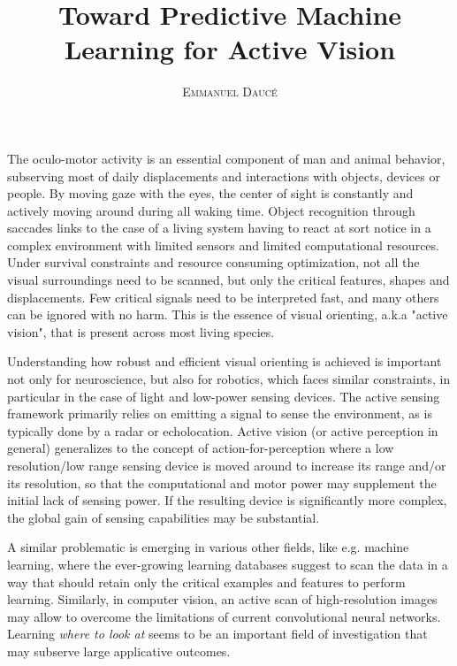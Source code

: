 \documentclass[12pt,twoside,openright]{article}
\title{\textbf{Toward Predictive Machine Learning for Active Vision} }
\author{\textsc{Emmanuel Daucé}}%
\date{}
\begin{document}
	
\maketitle
	
	The oculo-motor activity is an essential component of man and animal behavior, subserving most of daily displacements and interactions with objects, devices or people. By moving gaze with the eyes, the center of sight is constantly and actively moving around during all waking time.  %
	Object recognition through saccades links to the case of a living system having to react at sort notice in a complex environment with limited sensors and limited computational resources. Under survival constraints and resource consuming optimization, not all the visual surroundings need to be scanned, but only the critical features, shapes and displacements. Few critical signals need to be interpreted fast, and many others can be ignored with no harm. This is the essence of visual orienting, a.k.a "active vision", that is present across most living species.  
	
	Understanding how robust and efficient visual orienting is achieved is important not only for neuroscience, but also for robotics, which faces similar constraints, in particular in the case of light and low-power sensing devices.  The active sensing framework primarily relies on emitting a signal to sense the environment, as is typically done by a radar or echolocation. Active vision (or active perception in general) generalizes to the concept of action-for-perception where a low resolution/low range sensing device is moved around to increase its range and/or its resolution, so that the computational and motor power may supplement the initial lack of sensing power. {\color{magenta} If the resulting device is significantly more complex, the global gain of sensing capabilities may be substantial.}
	  
	A similar problematic is emerging in various other fields, like e.g. machine learning, where the ever-growing  learning databases suggest to scan the data in a way that should retain only the critical examples and features to perform learning. Similarly, in computer vision, an active scan of high-resolution images may allow to overcome the limitations of current convolutional neural networks. Learning \emph{where to look at} seems to be an important field of investigation that may subserve large applicative outcomes.
	
\end{document}
